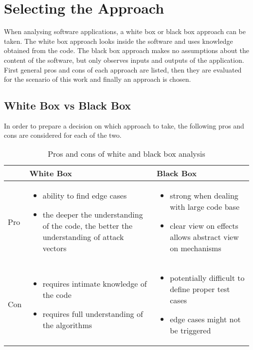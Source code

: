 \section{Selecting the Approach} \label{section:luckypatcher-analysis}
When analysing software applications, a white box or black box approach can be taken.
The white box approach looks inside the software and uses knowledge obtained from the code.
The black box approach makes no assumptions about the content of the software, but only observes inputs and outputs of the application.
\newline
First general pros and cons of each approach are listed, then they are evaluated for the scenario of this work and finally an approach is chosen.
\subsection{White Box vs Black Box}
In order to prepare a decision on which approach to take, the following pros and cons are considered for each of the two.
\begin{table}[h]
  \centering
\begin{tabular}
  {|l|p{}|p{}|}
  \hline
   & White Box & Black Box \\ \hline
  Pro &
  \begin{itemize}
    \item ability to find edge cases
    \item the deeper the understanding of the code, the better the understanding of attack vectors
  \end{itemize} & \begin{itemize}
    \item strong when dealing with large code base
    \item clear view on effects allows abstract view on mechanisms
  \end{itemize} \\ \hline
  Con&
  \begin{itemize}
    \item requires intimate knowledge of the code
    \item requires full understanding of the algorithms
  \end{itemize} & \begin{itemize}
    \item potentially difficult to define proper test cases
    \item edge cases might not be triggered
  \end{itemize} \\ \hline
\end{tabular}
\caption{Pros and cons of white and black box analysis}
\label{my-label}
\end{table}

